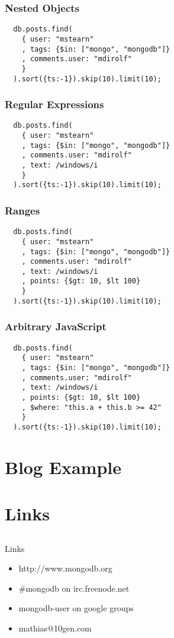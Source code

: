 \documentclass{beamer}
\begin{document}
\begin{frame}[fragile]
  \frametitle{Nested Objects}

  \begin{verbatim}
  db.posts.find(
    { user: "mstearn"
    , tags: {$in: ["mongo", "mongodb"]}
    , comments.user: "mdirolf"
    }
  ).sort({ts:-1}).skip(10).limit(10);
  \end{verbatim}
  
\end{frame}
\begin{frame}[fragile]
  \frametitle{Regular Expressions}

  \begin{verbatim}
  db.posts.find(
    { user: "mstearn"
    , tags: {$in: ["mongo", "mongodb"]}
    , comments.user: "mdirolf"
    , text: /windows/i
    }
  ).sort({ts:-1}).skip(10).limit(10);
  \end{verbatim}
  
\end{frame}
\begin{frame}[fragile]
  \frametitle{Ranges}

  \begin{verbatim}
  db.posts.find(
    { user: "mstearn"
    , tags: {$in: ["mongo", "mongodb"]}
    , comments.user: "mdirolf"
    , text: /windows/i
    , points: {$gt: 10, $lt 100}
    }
  ).sort({ts:-1}).skip(10).limit(10);
  \end{verbatim}
  
\end{frame}
\begin{frame}[fragile]
  \frametitle{Arbitrary JavaScript}

  \begin{verbatim}
  db.posts.find(
    { user: "mstearn"
    , tags: {$in: ["mongo", "mongodb"]}
    , comments.user: "mdirolf"
    , text: /windows/i
    , points: {$gt: 10, $lt 100}
    , $where: "this.a + this.b >= 42"
    }
  ).sort({ts:-1}).skip(10).limit(10);
  \end{verbatim}
\end{frame}
  
\section{Blog Example}
\subsection{}

\section{Links}
\subsection{}

\begin{frame}{Links}
  \begin{itemize}
    \item http://www.mongodb.org
    \item \#mongodb on irc.freenode.net
    \item mongodb-user on google groups
    \item mathias@10gen.com
  \end{itemize}
\end{frame}
\end{document}
